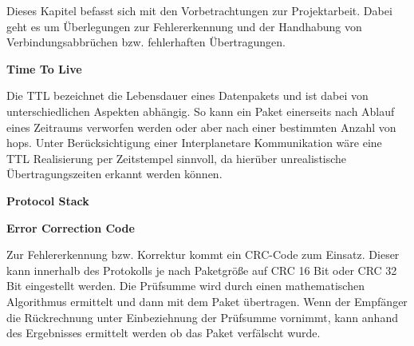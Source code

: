 

Dieses Kapitel befasst sich mit den Vorbetrachtungen zur Projektarbeit. Dabei
geht es um {\"U}berlegungen zur Fehlererkennung und der Handhabung von
Verbindungsabbr{\"u}chen bzw. fehlerhaften {\"U}bertragungen.

\textbf{Time To Live}

Die TTL bezeichnet die Lebensdauer eines Datenpakets und ist dabei von
unterschiedlichen Aspekten abh{\"a}ngig. So kann ein Paket einerseits nach
Ablauf eines Zeitraums verworfen werden oder aber nach einer bestimmten Anzahl
von hops.  Unter Ber{\"u}cksichtigung einer Interplanetare Kommunikation
w{\"a}re eine TTL Realisierung per Zeitstempel sinnvoll, da hier{\"u}ber
unrealistische {\"U}bertragungszeiten erkannt werden k{\"o}nnen.

\textbf{Protocol Stack}



\textbf{Error Correction Code}

Zur Fehlererkennung bzw. Korrektur kommt ein CRC-Code zum Einsatz. Dieser kann
innerhalb des Protokolls je nach Paketgr{\"o}{\ss}e auf CRC 16 Bit oder CRC 32
Bit eingestellt werden. Die Pr{\"u}fsumme wird durch einen mathematischen
Algorithmus ermittelt und dann mit dem Paket {\"u}bertragen. Wenn der
Empf{\"a}nger die R{\"u}ckrechnung unter Einbeziehnung der Pr{\"u}fsumme
vornimmt, kann anhand des Ergebnisses ermittelt werden ob das Paket
verf{\"a}lscht wurde. 
